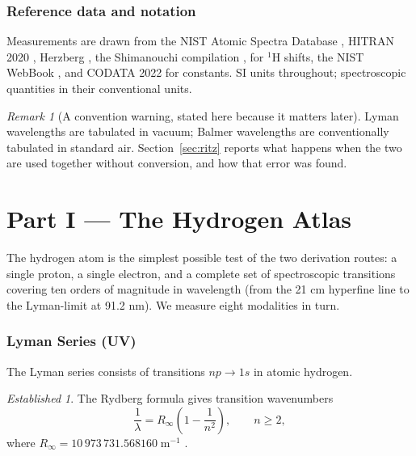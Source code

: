 \documentclass[11pt,a4paper]{article}
\theoremstyle{stmtstyle}
\theoremstyle{definition}
\theoremstyle{remark}
\newtheorem*{established}{Established}
\newtheorem*{remark}{Remark}
\begin{document}
\section{Reference data and notation}
\label{sec:sources}

Measurements are drawn from the NIST Atomic Spectra Database
\citep{nistasd2023}, HITRAN 2020 \citep{hitran2020}, Herzberg
\citep{herzberg1944,herzberg1950}, the Shimanouchi compilation
\citep{shimanouchi1972}, \citet{harris2002} for $^{1}$H shifts, the NIST
WebBook \citep{nistwebbook}, and CODATA 2022 \citep{codata2022} for
constants. SI units throughout; spectroscopic quantities in their
conventional units.

\begin{remark}[A convention warning, stated here because it matters later]
\label{rem:convention}
Lyman wavelengths are tabulated in vacuum; Balmer wavelengths are
conventionally tabulated in standard air. Section~\ref{sec:ritz} reports
what happens when the two are used together without conversion, and how
that error was found.
\end{remark}

\clearpage
\part*{Part I --- The Hydrogen Atlas}

The hydrogen atom is the simplest possible test of the two derivation routes: a single proton, a single electron, and a complete set of spectroscopic transitions covering ten orders of magnitude in wavelength (from the 21 cm hyperfine line to the Lyman-limit at 91.2 nm). We measure eight modalities in turn.

\section{Lyman Series (UV)}
\label{sec:hlyman}

The Lyman series consists of transitions $np \to 1s$ in atomic hydrogen.

\begin{established}
The Rydberg formula gives transition wavenumbers
\begin{equation}
\frac{1}{\lambda} = R_{\infty}\left(1 - \frac{1}{n^{2}}\right), \qquad n \geq 2,
\label{eq:lymanrydberg}
\end{equation}
where $R_{\infty} = 10\,973\,731.568160\;\mathrm{m}^{-1}$ \citep{codata2022}.
\end{established}
\end{document}
